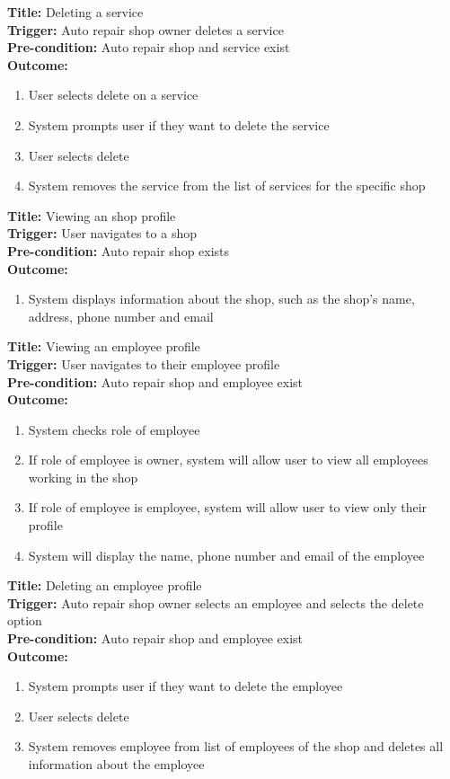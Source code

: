 \documentclass[12pt]{article}
\begin{document}
\textbf{Title:} Deleting a service\\
\textbf{Trigger:} Auto repair shop owner deletes a service\\
\textbf{Pre-condition:} Auto repair shop and service exist\\
\textbf{Outcome:}
\begin{enumerate}
	\item User selects delete on a service
	\item System prompts user if they want to delete the service
	\item User selects delete
	\item System removes the service from the list of services for the specific shop
\end{enumerate}

\textbf{Title:} Viewing an shop profile\\
\textbf{Trigger:} User navigates to a shop\\
\textbf{Pre-condition:} Auto repair shop exists\\
\textbf{Outcome:}
\begin{enumerate}
	\item System displays information about the shop, such as the shop's name, address, phone number and
	      email
\end{enumerate}

\textbf{Title:} Viewing an employee profile\\
\textbf{Trigger:} User navigates to their employee profile\\
\textbf{Pre-condition:} Auto repair shop and employee exist\\
\textbf{Outcome:}
\begin{enumerate}
	\item System checks role of employee
	\item If role of employee is owner, system will allow user to view all employees working in the shop
	\item If role of employee is employee, system will allow user to view only their profile
	\item System will display the name, phone number and email of the employee
\end{enumerate}

\textbf{Title:} Deleting an employee profile\\
\textbf{Trigger:} Auto repair shop owner selects an employee and selects the delete option\\
\textbf{Pre-condition:} Auto repair shop and employee exist\\
\textbf{Outcome:}
\begin{enumerate}
	\item System prompts user if they want to delete the employee
	\item User selects delete
	\item System removes employee from list of employees of the shop and deletes all information about the
	      employee
\end{enumerate}
\end{document}
